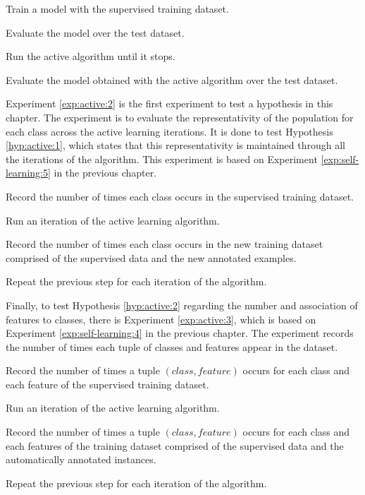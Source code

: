\begin{experiment}\label{exp:active:1}
  \begin{enumexp}
    \item Train a model with the supervised training dataset.
    \item Evaluate the model over the test dataset.
    \item Run the active algorithm until it stops.
    \item Evaluate the model obtained with the active algorithm over the test
      dataset.
  \end{enumexp}
\end{experiment}

Experiment \ref{exp:active:2} is the first experiment to test a hypothesis in
this chapter. The experiment is to evaluate the representativity of the
population for each class across the active learning iterations. It is done to
test Hypothesis \ref{hyp:active:1}, which states that this representativity is
maintained through all the iterations of the algorithm. This experiment is
based on Experiment \ref{exp:self-learning:5} in the previous chapter.

\begin{experiment}\label{exp:active:2}
  \begin{enumexp}
    \item Record the number of times each class occurs in the supervised
      training dataset.
    \item Run an iteration of the active learning algorithm.
    \item Record the number of times each class occurs in the new training
      dataset comprised of the supervised data and the new annotated
      examples.
    \item Repeat the previous step for each iteration of the algorithm.
  \end{enumexp}
\end{experiment}

Finally, to test Hypothesis \ref{hyp:active:2} regarding the number and
association of features to classes, there is Experiment \ref{exp:active:3},
which is based on Experiment \ref{exp:self-learning:4} in the previous chapter.
The experiment records the number of times each tuple of classes and features
appear in the dataset.

\begin{experiment}\label{exp:active:3}
  \begin{enumexp}
    \item Record the number of times a tuple $(class, feature)$ occurs for each
      class and each feature of the supervised training dataset.
    \item Run an iteration of the active learning algorithm.
    \item Record the number of times a tuple $(class, feature)$ occurs for each
      class and each features of the training dataset comprised of the
      supervised data and the automatically annotated instances.
    \item Repeat the previous step for each iteration of the algorithm.
  \end{enumexp}
\end{experiment}

